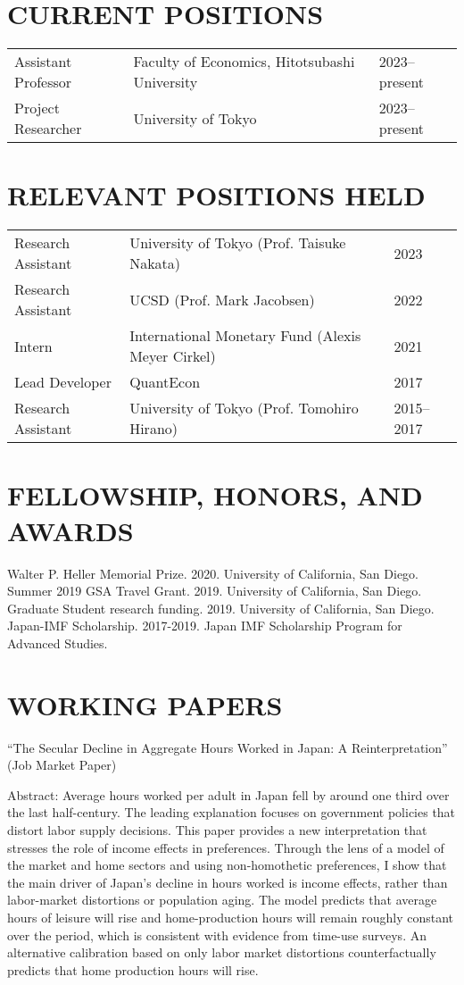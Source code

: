 \documentclass[12pt]{article}
\begin{document}
\section*{CURRENT POSITIONS}
\begin{tabular}{@{}lll}
Assistant Professor &Faculty of Economics, Hitotsubashi University& 2023--present\\
Project Researcher &University of Tokyo& 2023--present
\end{tabular}

\section*{RELEVANT POSITIONS HELD}
\begin{tabular}{@{}lll}
Research Assistant &University of Tokyo (Prof. Taisuke Nakata)& 2023\\
Research Assistant &UCSD (Prof. Mark Jacobsen)& 2022\\
Intern &International Monetary Fund (Alexis Meyer Cirkel)& 2021\\
Lead Developer &QuantEcon& 2017\\
Research Assistant &University of Tokyo (Prof. Tomohiro Hirano)& 2015--2017
\end{tabular}

\section*{FELLOWSHIP, HONORS, AND AWARDS}
Walter P. Heller Memorial Prize. 2020. University of California, San Diego.\\
Summer 2019 GSA Travel Grant. 2019. University of California, San Diego.\\
Graduate Student research funding. 2019. University of California, San Diego.\\
Japan-IMF Scholarship. 2017-2019. Japan IMF Scholarship Program for Advanced Studies.

\section*{WORKING PAPERS}
``The Secular Decline in Aggregate Hours Worked in Japan: A Reinterpretation'' (Job Market Paper)
\begin{adjustwidth}{1em}{1em}
Abstract: Average hours worked per adult in Japan fell by around one third over the last half-century. The leading explanation focuses on government policies that distort labor supply decisions. This paper provides a new interpretation that stresses the role of income effects in preferences. Through the lens of a model of the market and home sectors and using non-homothetic preferences, I show that the main driver of Japan's decline in hours worked is income effects, rather than labor-market distortions or population aging. The model predicts that average hours of leisure will rise and home-production hours will remain roughly constant over the period, which is consistent with evidence from time-use surveys. An alternative calibration based on only labor market distortions counterfactually predicts that home production hours will rise.
\end{adjustwidth}
\end{document}
